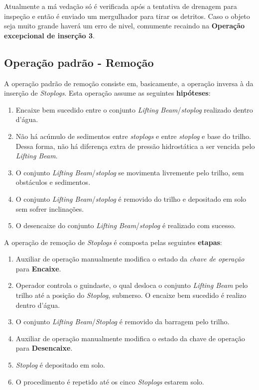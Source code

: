 Atualmente a má vedação só é verificada após a tentativa de drenagem para
inspeção e então é enviado um mergulhador para tirar os detritos. Caso o objeto
seja muito grande haverá um erro de nivel, comumente recaindo na \textbf{Operação
excepcional de inserção 3}. 




\subsection{Operação padrão - Remoção}
A operação padrão de remoção consiste em, basicamente, a operação inversa à da inserção de \emph{Stoplogs}. Esta operação assume as seguintes \textbf{hipóteses}:

\begin{enumerate}
\item Encaixe bem sucedido entre o conjunto \emph{Lifting Beam}/\emph{stoplog}
realizado dentro d'água.
\item Não há acúmulo de sedimentos entre \emph{stoplogs} e entre \emph{stoplog} e base do trilho. Dessa forma, não há diferença extra de pressão hidrostática a ser vencida pelo \emph{Lifting Beam}.
\label{hip:rem:2}
\item O conjunto \emph{Lifting Beam}/\emph{stoplog} se movimenta livremente pelo trilho, sem obstáculos e sedimentos.
\item O conjunto \emph{Lifting Beam}/\emph{stoplog} é removido do trilho e depositado em solo sem sofrer inclinações.  
\item O desencaixe do conjunto \emph{Lifting Beam}/\emph{stoplog} é realizado com sucesso.
\end{enumerate}

A operação de remoção de \emph{Stoplogs} é composta pelas seguintes \textbf{etapas}:
\begin{enumerate}
\item Auxiliar de operação manualmente modifica o estado da \emph{chave de operação} para \textbf{Encaixe}.
\item Operador controla o guindaste, o qual desloca o conjunto \emph{Lifting Beam} pelo trilho até a posição do \emph{Stoplog}, submerso. O encaixe bem sucedido é realizo dentro d'água.
\item O conjunto \emph{Lifting Beam}/\emph{Stoplog} é removido da barragem pelo trilho. 
\item Auxiliar de operação manualmente modifica o estado da chave de operação para \textbf{Desencaixe}.
\item \emph{Stoplog} é depositado em solo.
\item O procedimento é repetido até os cinco \emph{Stoplogs} estarem solo.
\end{enumerate}

